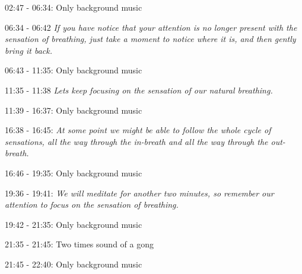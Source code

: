 02:47 - 06:34: Only background music

06:34 - 06:42 \textit{If you have notice that your attention is no longer present with the sensation of breathing, just take a moment to notice where it is, and then gently bring it back. }

06:43 - 11:35: Only background music

11:35 - 11:38 \textit{Lets keep focusing on the sensation of our natural breathing.}

11:39 - 16:37: Only background music

16:38 - 16:45: \textit{At some point we might be able to follow the whole cycle of sensations, all the way through the in-breath and all the way through the out-breath. }

16:46 - 19:35: Only background music

19:36 - 19:41: \textit{We will meditate for another two minutes, so remember our attention to focus on the sensation of breathing.}

19:42 - 21:35: Only background music 

21:35 - 21:45: Two times sound of a gong  

21:45 - 22:40: Only background music 